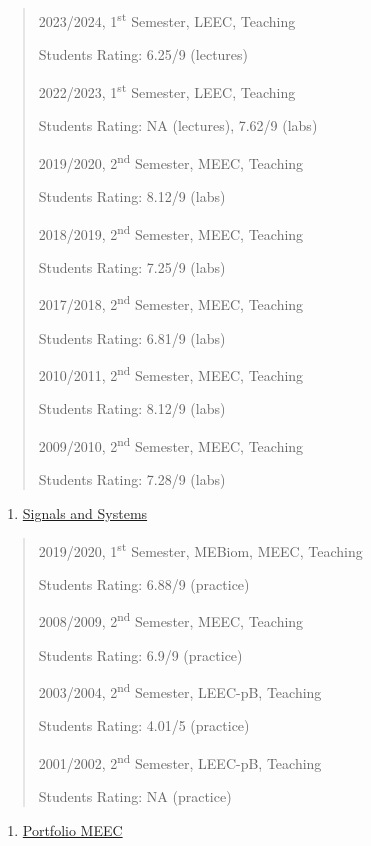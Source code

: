 \begin{quote}
2023/2024, 1\textsuperscript{st} Semester, LEEC, Teaching

Students Rating: 6.25/9 (lectures)

2022/2023, 1\textsuperscript{st} Semester, LEEC, Teaching

Students Rating: NA (lectures), 7.62/9 (labs)

2019/2020, 2\textsuperscript{nd} Semester, MEEC, Teaching

Students Rating: 8.12/9 (labs)

2018/2019, 2\textsuperscript{nd} Semester, MEEC, Teaching

Students Rating: 7.25/9 (labs)

2017/2018, 2\textsuperscript{nd} Semester, MEEC, Teaching

Students Rating: 6.81/9 (labs)

2010/2011, 2\textsuperscript{nd} Semester, MEEC, Teaching

Students Rating: 8.12/9 (labs)

2009/2010, 2\textsuperscript{nd} Semester, MEEC, Teaching

Students Rating: 7.28/9 (labs)
\end{quote}

\begin{enumerate}
\def\labelenumi{\arabic{enumi}.}
\setcounter{enumi}{13}
\item
  \ul{Signals and Systems}
\end{enumerate}

\begin{quote}
2019/2020, 1\textsuperscript{st} Semester, MEBiom, MEEC, Teaching

Students Rating: 6.88/9 (practice)

2008/2009, 2\textsuperscript{nd} Semester, MEEC, Teaching

Students Rating: 6.9/9 (practice)

2003/2004, 2\textsuperscript{nd} Semester, LEEC-pB, Teaching

Students Rating: 4.01/5 (practice)

2001/2002, 2\textsuperscript{nd} Semester, LEEC-pB, Teaching

Students Rating: NA (practice)
\end{quote}

\begin{enumerate}
\def\labelenumi{\arabic{enumi}.}
\setcounter{enumi}{14}
\item
  \ul{Portfolio MEEC}
\end{enumerate}


